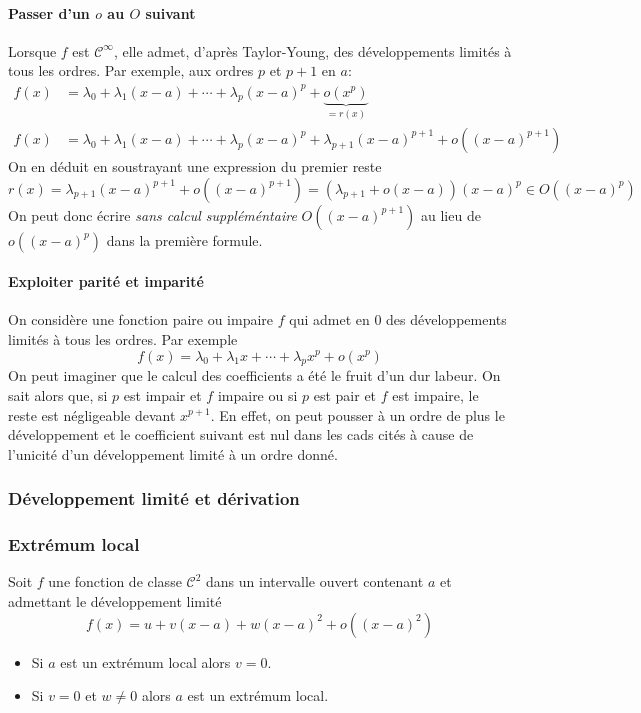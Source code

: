 \paragraph{Passer d'un $o$ au $O$ suivant}
Lorsque $f$ est $\mathcal C^\infty$, elle admet, d'après Taylor-Young, des développements limités à tous les ordres. Par exemple, aux ordres $p$ et $p+1$ en $a$:
\begin{align*}
 f(x) &= \lambda_0 + \lambda_1(x-a)+\cdots+\lambda_p(x-a)^p+ \underset{= r(x)}{\underbrace{o(x^p)}}\\
 f(x) &= \lambda_0 + \lambda_1(x-a)+\cdots+\lambda_p(x-a)^p+ \lambda_{p+1}(x-a)^{p+1}+o((x-a)^{p+1})
\end{align*}
On en déduit en soustrayant une expression du premier reste
\begin{displaymath}
 r(x)= \lambda_{p+1}(x-a)^{p+1}+o((x-a)^{p+1})=\left(\lambda_{p+1}+o(x-a) \right)(x-a)^p \in O((x-a)^p) 
\end{displaymath}
On peut donc écrire \emph{sans calcul suppléméntaire} $O((x-a)^{p+1})$ au lieu de $o((x-a)^p)$ dans la première formule.
\paragraph{Exploiter parité et imparité}
On considère une fonction paire ou impaire $f$ qui admet en $0$ des développements limités à tous les ordres. Par exemple
\begin{displaymath}
 f(x) = \lambda_0+\lambda_1x+\cdots+\lambda_p x^p + o(x^p)
\end{displaymath}
On peut imaginer que le calcul des coefficients a été le fruit d'un dur labeur. On sait alors que, si $p$ est impair et $f$ impaire ou si $p$ est pair et $f$ est impaire, le reste est négligeable devant $x^{p+1}$. En effet, on peut pousser à un ordre de plus le développement et le coefficient suivant est nul dans les cads cités à cause de l'unicité d'un développement limité à un ordre donné.

\subsubsection{Développement limité et dérivation}
\subsubsection{Extrémum local}
\begin{prop}
Soit $f$ une fonction de classe $\mathcal{C}^2$ dans un intervalle ouvert contenant $a$ et admettant le développement limité
\begin{displaymath}
  f(x) = u + v(x-a) + w(x-a)^2 + o((x-a)^2) 
\end{displaymath}
\begin{itemize}
  \item Si $a$ est un extrémum local alors $v = 0$.
  \item Si $v=0$ et $w\neq 0$ alors $a$ est un extrémum local.
\end{itemize}
\end{prop}


